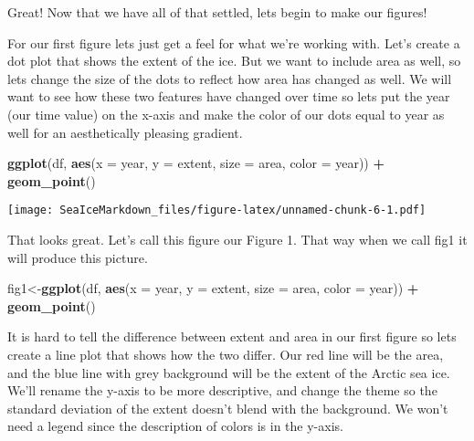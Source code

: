 \documentclass[]{article}
\newenvironment{Shaded}{\begin{snugshade}}{\end{snugshade}}
\newcommand{\KeywordTok}[1]{\textcolor[rgb]{0.13,0.29,0.53}{\textbf{#1}}}
\newcommand{\DataTypeTok}[1]{\textcolor[rgb]{0.13,0.29,0.53}{#1}}
\newcommand{\StringTok}[1]{\textcolor[rgb]{0.31,0.60,0.02}{#1}}
\newcommand{\OperatorTok}[1]{\textcolor[rgb]{0.81,0.36,0.00}{\textbf{#1}}}
\newcommand{\NormalTok}[1]{#1}
\begin{document}
Great! Now that we have all of that settled, lets begin to make our
figures!

For our first figure lets just get a feel for what we're working with.
Let's create a dot plot that shows the extent of the ice. But we want to
include area as well, so lets change the size of the dots to reflect how
area has changed as well. We will want to see how these two features
have changed over time so lets put the year (our time value) on the
x-axis and make the color of our dots equal to year as well for an
aesthetically pleasing gradient.

\begin{Shaded}
\begin{Highlighting}[]
\KeywordTok{ggplot}\NormalTok{(df, }\KeywordTok{aes}\NormalTok{(}\DataTypeTok{x =}\NormalTok{ year, }\DataTypeTok{y =}\NormalTok{ extent, }\DataTypeTok{size =}\NormalTok{ area, }\DataTypeTok{color =}\NormalTok{ year)) }\OperatorTok{+}
\StringTok{  }\KeywordTok{geom_point}\NormalTok{()}
\end{Highlighting}
\end{Shaded}

\texttt{[image: SeaIceMarkdown\_files/figure-latex/unnamed-chunk-6-1.pdf]}

That looks great. Let's call this figure our Figure 1. That way when we
call fig1 it will produce this picture.

\begin{Shaded}
\begin{Highlighting}[]
\NormalTok{fig1<-}\KeywordTok{ggplot}\NormalTok{(df, }\KeywordTok{aes}\NormalTok{(}\DataTypeTok{x =}\NormalTok{ year, }\DataTypeTok{y =}\NormalTok{ extent, }\DataTypeTok{size =}\NormalTok{ area, }\DataTypeTok{color =}\NormalTok{ year)) }\OperatorTok{+}
\StringTok{  }\KeywordTok{geom_point}\NormalTok{()}
\end{Highlighting}
\end{Shaded}

It is hard to tell the difference between extent and area in our first
figure so lets create a line plot that shows how the two differ. Our red
line will be the area, and the blue line with grey background will be
the extent of the Arctic sea ice. We'll rename the y-axis to be more
descriptive, and change the theme so the standard deviation of the
extent doesn't blend with the background. We won't need a legend since
the description of colors is in the y-axis.
\end{document}
